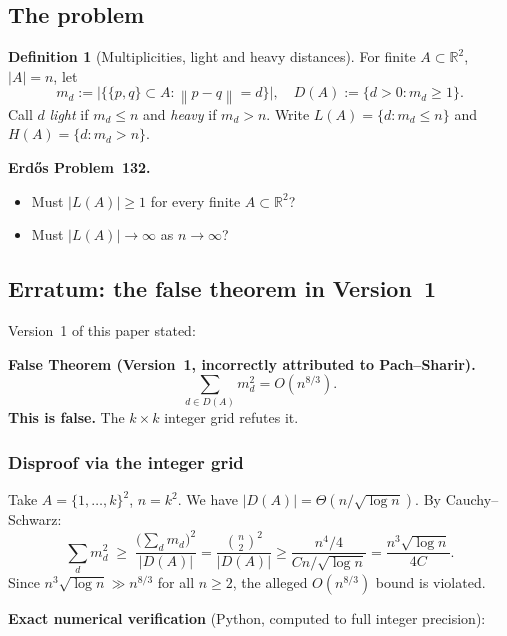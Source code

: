 \documentclass[12pt,a4paper]{amsart}
\def\cL{\textit{L}}\def\cH{\textit{H}}%
\theoremstyle{plain}
\theoremstyle{definition}
\newtheorem{definition}[theorem]{Definition}
\newcommand{\R}{\mathbb{R}}
\newcommand{\norm}[1]{\left\lVert #1 \right\rVert}
\newcommand{\cL}{\mathcal{L}}
\newcommand{\cH}{\mathcal{H}}
\begin{document}
\subsection{The problem}

\begin{definition}[Multiplicities, light and heavy distances]
For finite $A\subset\R^2$, $|A|=n$, let
\[
  m_d := \bigl|\bigl\{\{p,q\}\subset A:\norm{p-q}=d\bigr\}\bigr|,\quad
  D(A) := \{d>0:m_d\ge 1\}.
\]
Call $d$ \emph{light} if $m_d\le n$ and \emph{heavy} if $m_d>n$.
Write $\cL(A)=\{d:m_d\le n\}$ and $\cH(A)=\{d:m_d>n\}$.
\end{definition}

\textbf{Erd\H{o}s Problem~132.}
\begin{itemize}
  \item[\textbf{Q1}] Must $|\cL(A)|\ge 1$ for every finite $A\subset\R^2$?
  \item[\textbf{Q2}] Must $|\cL(A)|\to\infty$ as $n\to\infty$?
\end{itemize}

\subsection{Erratum: the false theorem in Version~1}

Version~1 of this paper stated:

\begin{mdframed}[style=erratum]
\textbf{False Theorem (Version~1, incorrectly attributed to Pach--Sharir).}
\[
  \sum_{d \in D(A)} m_d^2 = O(n^{8/3}).
\]
\textbf{This is false.}  The $k\times k$ integer grid refutes it.
\end{mdframed}

\subsubsection{Disproof via the integer grid}

Take $A=\{1,\ldots,k\}^2$, $n=k^2$.  We have
$|D(A)|=\Theta(n/\sqrt{\log n})$.  By Cauchy--Schwarz:
\[
  \sum_d m_d^2 \;\ge\; \frac{\bigl(\sum_d m_d\bigr)^2}{|D(A)|}
  = \frac{\binom{n}{2}^2}{|D(A)|}
  \ge \frac{n^4/4}{Cn/\sqrt{\log n}}
  = \frac{n^3\sqrt{\log n}}{4C}.
\]
Since $n^3\sqrt{\log n}\gg n^{8/3}$ for all $n\ge 2$, the alleged
$O(n^{8/3})$ bound is violated.

\textbf{Exact numerical verification} (Python, computed to full integer precision):
\end{document}
